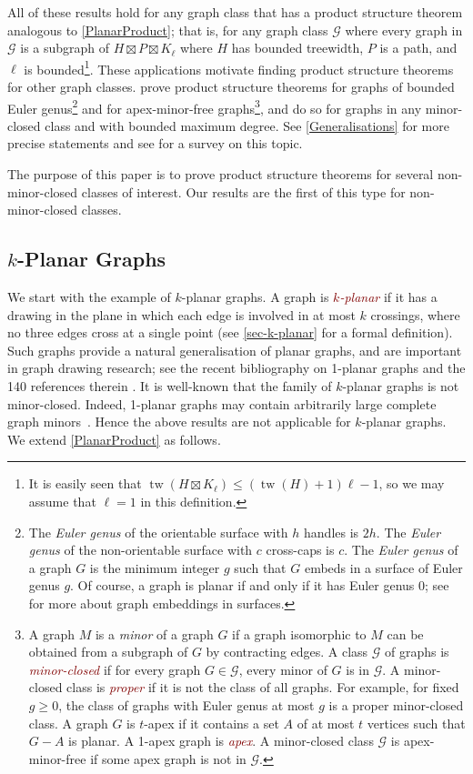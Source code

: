 \documentclass{patmorin}
\newcommand{\defin}[1]{\textcolor{Maroon}{\emph{#1}}}
\DeclareMathOperator{\tw}{tw}
\renewcommand{\geq}{\geqslant}
\renewcommand{\leq}{\leqslant}
\begin{document}
All of these results hold for any graph class that has a product structure theorem analogous to \cref{PlanarProduct}; that is, for any graph class  $\mathcal{G}$ where every graph in $\mathcal{G}$ is a subgraph of $H\boxtimes P\boxtimes K_\ell$ where $H$ has bounded treewidth, $P$ is a path, and $\ell$ is bounded\footnote{It is easily seen that $\tw(H\boxtimes K_\ell) \leq (\tw(H)+1)\ell-1$, so we may assume that $\ell=1$ in this definition.}. These applications motivate finding product structure theorems for other graph classes. \citet{DJMMUW20} prove product structure theorems for graphs of bounded Euler genus\footnote{The \textit{Euler genus} of the orientable surface with $h$ handles is $2h$. The \textit{Euler genus} of the non-orientable surface with $c$ cross-caps is $c$. The \textit{Euler genus} of a graph $G$ is the minimum integer $g$ such that $G$ embeds in a surface of Euler genus $g$. Of course, a graph is planar if and only if it has Euler genus 0; see \citep{mohar.thomassen:graphs} for more about graph embeddings in surfaces.} and for apex-minor-free graphs\footnote{A graph $M$ is a \textit{minor} of a graph $G$ if a graph isomorphic to $M$ can be obtained from a subgraph of $G$ by contracting edges. A class $\mathcal{G}$ of graphs is \defin{minor-closed} if for every graph $G\in\mathcal{G}$, every minor of $G$ is in $\mathcal{G}$. A minor-closed class is \defin{proper} if it is not the class of all graphs. For example, for fixed $g\geq 0$, the class of graphs with Euler genus at most $g$ is a proper minor-closed class. A graph $G$ is $t$-apex if it contains a set $A$ of at most $t$ vertices such that $G-A$ is planar. A 1-apex graph is \defin{apex}.  A minor-closed class $\mathcal{G}$ is apex-minor-free if some apex graph is not in $\mathcal{G}$.}, and \citet{DEMWW22} do so for graphs in any minor-closed class and with bounded maximum degree. See \cref{Generalisations} for more precise statements and see \citep{DHJLW21} for a survey on this topic. 

The purpose of this paper is to prove product structure theorems for several non-minor-closed classes of interest. Our results are the first of this type for non-minor-closed classes.

\subsection{$k$-Planar Graphs}

We start with the example of $k$-planar graphs. A graph is \defin{$k$-planar} if it has a drawing in the plane in which each edge is involved in at most $k$ crossings, where no three edges cross at a single point (see \cref{sec-k-planar} for a formal definition). Such graphs provide a natural generalisation of planar graphs, and are important in graph drawing research; see the recent bibliography on 1-planar graphs and the 140 references therein \citep{kobourov.liotta.ea:annotated}. It is well-known that the family of $k$-planar graphs is not minor-closed.  Indeed, 1-planar graphs may contain arbitrarily large complete graph minors~\citep{dujmovic.eppstein.ea:structure}. Hence the above results are not applicable for  $k$-planar graphs. We extend \cref{PlanarProduct} as follows.
\end{document}
